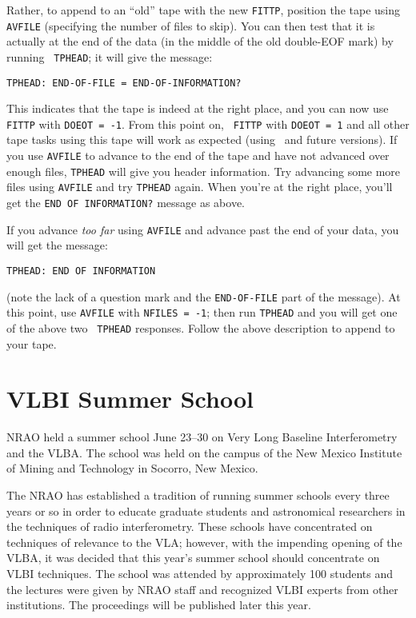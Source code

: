    Rather, to append to an ``old'' tape with the new {\tt FITTP},
position the tape using {\tt AVFILE} (specifying the number of files
to skip).  You can then test that it is actually at the end of the
data (in the middle of the old double-EOF mark) by running {\tt
TPHEAD}; it will give the message:
\begin{center}
\vskip -12pt
{\tt TPHEAD:  END-OF-FILE = END-OF-INFORMATION?}
\end{center}
\vskip -12pt
This indicates that the tape is indeed at the right place, and you can
now use {\tt FITTP} with {\tt DOEOT = -1}.  From this point on, {\tt
FITTP} with {\tt DOEOT = 1} and all other tape tasks using this tape
will work as expected (using \RELEASENAME\ and future versions).
If you use {\tt AVFILE} to advance to the end of the tape and have not
advanced over enough files, {\tt TPHEAD} will give you header
information.  Try advancing some more files using {\tt AVFILE} and try
{\tt TPHEAD} again.  When you're at the right place, you'll get the
{\tt END OF INFORMATION?} message as above.

If you advance {\it too far} using {\tt AVFILE} and advance past the
end of your data, you will get the message:
\begin{center}
\vskip -12pt
{\tt TPHEAD: END OF INFORMATION}
\end{center}
\vskip -12pt
(note the lack of a question mark and the {\tt END-OF-FILE} part of
the message).  At this point, use {\tt AVFILE} with {\tt NFILES = -1};
then run {\tt TPHEAD} and you will get one of the above two {\tt
TPHEAD} responses.  Follow the above description to append to your
tape.

\section{VLBI Summer School}

NRAO held a summer school June 23--30 on Very Long Baseline
Interferometry and the VLBA. The school was held on the campus of the
New Mexico Institute of Mining and Technology in Socorro, New Mexico.

The NRAO has established a tradition of running summer schools every
three years or so in order to educate graduate students and
astronomical researchers in the techniques of radio interferometry.
These schools have concentrated on techniques of relevance to the VLA;
however, with the impending opening of the VLBA, it was decided that
this year's summer school should concentrate on VLBI techniques.  The
school was attended by approximately 100 students and the lectures
were given by NRAO staff and recognized VLBI experts from other
institutions.  The proceedings will be published later this year.

